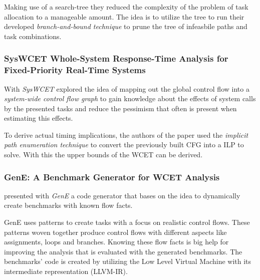 Making use of a search-tree they reduced the complexity of the problem of task allocation to a manageable amount.
The idea is to utilize the tree to run their developed \textit{branch-and-bound technique} to prune the tree of infeasbile paths and task combinations.

\subsubsection{SysWCET\: Whole-System Response-Time Analysis for Fixed-Priority Real-Time Systems}\label{sec:related_work:2}
With \textit{SysWCET} \textcite{dietrichSysWCETWholeSystemResponseTime} explored the idea of mapping out the global control flow into a \textit{system-wide control flow graph} to gain knowledge about the effects of system calls by the presented tasks and reduce the pessimism that often is present when estimating this effects.

To derive actual timing implications, the authors of the paper used the \textit{implicit path enumeration technique} to convert the previously built \ac{CFG} into a \ac{ILP} to solve.
With this the upper bounds of the \ac{WCET} can be derived.

\subsubsection{GenE: A Benchmark Generator for WCET Analysis}\label{sec:related_work:3}
\textcite{wagemannGenEBenchmarkGenerator2015} presented with \textit{GenE} a code generator that bases on the idea to dynamically create benchmarks with known flow facts.

GenE uses patterns to create tasks with a focus on realistic control flows.
These patterns woven together produce control flows with different aspects like assignments, loops and branches.
Knowing these flow facts is big help for improving the analysis that is evaluated with the generated benchmarks.
The benchmarks' code is created by utilizing the Low Level Virtual Machine with its intermediate representation (LLVM-IR).